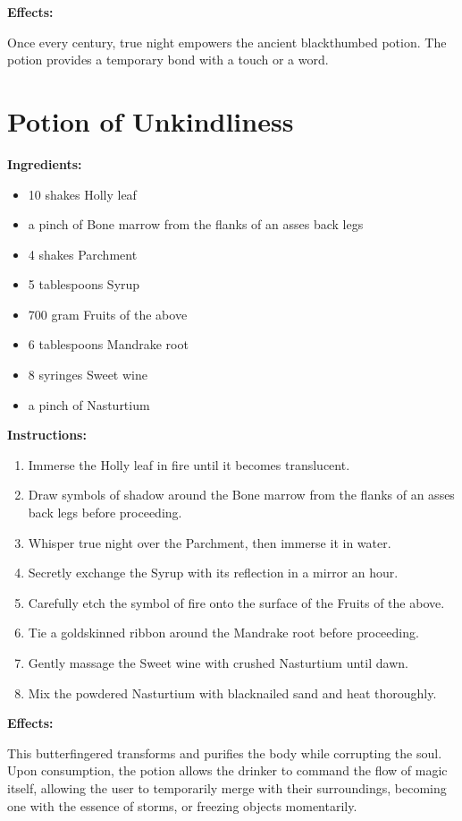 \documentclass{article}
\begin{document}
\textbf{Effects:}

Once every century, true night empowers the ancient blackthumbed potion. The potion provides a temporary bond with a touch or a word.

\newpage
\section*{Potion of Unkindliness}

\textbf{Ingredients:}

\begin{itemize}
  \item 10 shakes Holly leaf
  \item a pinch of Bone marrow from the flanks of an asses back legs
  \item 4 shakes Parchment
  \item 5 tablespoons Syrup
  \item 700 gram Fruits of the above
  \item 6 tablespoons Mandrake root
  \item 8 syringes Sweet wine
  \item a pinch of Nasturtium
\end{itemize}

\textbf{Instructions:}

\begin{enumerate}
  \item Immerse the Holly leaf in fire until it becomes translucent.
  \item Draw symbols of shadow around the Bone marrow from the flanks of an asses back legs before proceeding.
  \item Whisper true night over the Parchment, then immerse it in water.
  \item Secretly exchange the Syrup with its reflection in a mirror an hour.
  \item Carefully etch the symbol of fire onto the surface of the Fruits of the above.
  \item Tie a goldskinned ribbon around the Mandrake root before proceeding.
  \item Gently massage the Sweet wine with crushed Nasturtium until dawn.
  \item Mix the powdered Nasturtium with blacknailed sand and heat thoroughly.
\end{enumerate}

\textbf{Effects:}

This butterfingered transforms and purifies the body while corrupting the soul. Upon consumption, the potion allows the drinker to command the flow of magic itself, allowing the user to temporarily merge with their surroundings, becoming one with the essence of storms, or freezing objects momentarily.
\end{document}
